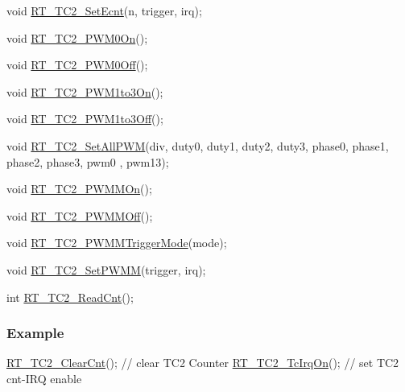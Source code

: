 \begin{DoxyCode}
\textcolor{keywordtype}{void} \mbox{\hyperlink{a00047_af07bf5769df0423324194f22e008e832}{RT\_TC2\_SetEcnt}}(n, trigger, irq);

\textcolor{keywordtype}{void} \mbox{\hyperlink{a00047_abaff3048e72dc0cb912c898a0a4c4e14}{RT\_TC2\_PWM0On}}();

\textcolor{keywordtype}{void} \mbox{\hyperlink{a00047_a52f984fc9f5bc4d1821025ad8d75f3c9}{RT\_TC2\_PWM0Off}}();

\textcolor{keywordtype}{void} \mbox{\hyperlink{a00047_adc090dee2463a2a27b57234e63f0c0b5}{RT\_TC2\_PWM1to3On}}();

\textcolor{keywordtype}{void} \mbox{\hyperlink{a00047_adec1566e2c2a16ab922163a22f3c99df}{RT\_TC2\_PWM1to3Off}}();

\textcolor{keywordtype}{void} \mbox{\hyperlink{a00047_a49e7120e90142442bdd0744f61b572a5}{RT\_TC2\_SetAllPWM}}(div, duty0, duty1, duty2, duty3, phase0, phase1, phase2, phase3, pwm0
      , pwm13);

\textcolor{keywordtype}{void} \mbox{\hyperlink{a00047_a37ffb0b466d2a13bb9917a818b06776b}{RT\_TC2\_PWMMOn}}();

\textcolor{keywordtype}{void} \mbox{\hyperlink{a00047_abe6d0acfd60eb7058f0622de867c5b87}{RT\_TC2\_PWMMOff}}();

\textcolor{keywordtype}{void} \mbox{\hyperlink{a00047_a80f5ade258504a1243ccb058dd860475}{RT\_TC2\_PWMMTriggerMode}}(mode);

\textcolor{keywordtype}{void} \mbox{\hyperlink{a00047_ad3b483689d5dd170a343222a71f43c9f}{RT\_TC2\_SetPWMM}}(trigger, irq);

\textcolor{keywordtype}{int}  \mbox{\hyperlink{a00047_a6591a513f367f6e7be0a90cb72aa3d49}{RT\_TC2\_ReadCnt}}();
\end{DoxyCode}


\subsubsection*{Example}


\begin{DoxyCode}
\mbox{\hyperlink{a00047_ab1818ddcd1db9a3582f3bc37e1d62881}{RT\_TC2\_ClearCnt}}();       \textcolor{comment}{// clear TC2 Counter}
\mbox{\hyperlink{a00047_a0d385385ff809f653b9e7a6d6a111838}{RT\_TC2\_TcIrqOn}}();        \textcolor{comment}{// set TC2 cnt-IRQ enable}
\end{DoxyCode}
 